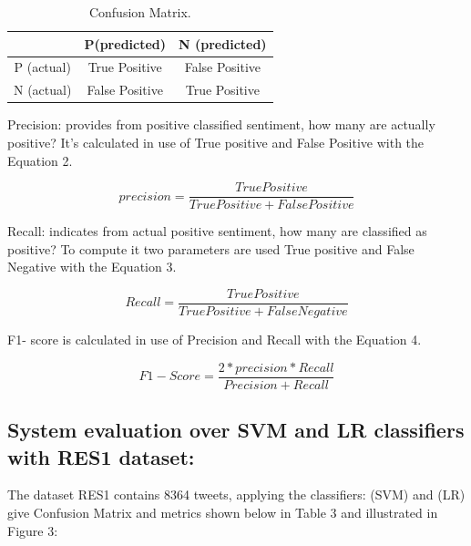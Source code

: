 \documentclass[conference]{IEEEtran}
\begin{document}
	\begin{table}[!ht]
		\large        %
		\caption{Confusion Matrix.}\label{label}
		\centering    %
		\begin{tabular}{|c|c|c|}
			\hline
			&P(predicted)&N (predicted)\\     %
			\hline
			P (actual)&True Positive&False Positive\\
			\hline
			N (actual)&False Positive&True Positive\\
			\hline
			
		\end{tabular}
	\end{table}
	
	
	Precision: provides from positive classified sentiment, how many are actually positive? It’s calculated in use of True positive and False Positive with the Equation 2.
	
	\begin{equation}
	precision =\frac{True Positive}{True Positive + False Positive}\label{Pr}
	\end{equation}
	
	Recall: indicates from actual positive sentiment, how many are classified as positive? To compute it two parameters are used True positive and False Negative with the Equation 3.
	
	\begin{equation}
	Recall =\frac{True Positive}{True Positive + False Negative}\label{Re}
	\end{equation}
	
	F1- score is calculated in use of Precision and Recall with the Equation 4.
	
	\begin{equation}
	F1-Score =\frac{2*precision*Recall}{Precision + Recall}\label{F1}
	\end{equation}
	\subsection{System evaluation over SVM and LR classifiers with RES1 dataset:}\label{AA}
	The dataset RES1 contains 8364 tweets,   applying the classifiers: (SVM) and (LR) give Confusion Matrix and metrics shown below in Table 3 and illustrated in Figure 3:
	
\end{document}
